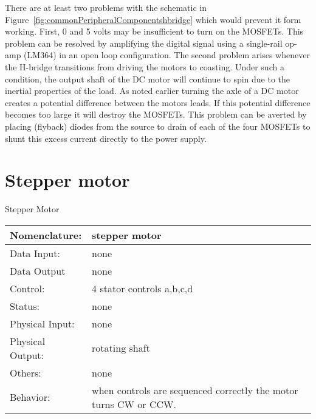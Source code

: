                             There are at least two problems with the schematic in
                            Figure~\ref{fig:commonPeripheralComponentshbridge} which would prevent it form working.
                            First, 0 and 5 volts may be insufficient to turn on the MOSFETs.
                            This problem can be resolved by amplifying the digital signal
                            using a single-rail op-amp (LM364) in an open loop configuration.
                            The second problem arises whenever the H-bridge transitions
                            from driving the motors to coasting.  Under such a condition, the
                            output shaft of the DC motor will continue to spin due to the
                            inertial properties of the load.  As noted earlier turning the
                            axle of a DC motor creates a potential difference between the
                            motors leads.  If this potential difference becomes too
                            large it will destroy the MOSFETs.
                            This problem can be averted by placing (flyback) diodes from the
                            source to drain of each of the four MOSFETs to shunt this excess
                            current directly to the power supply.

                            \section{Stepper motor}
                            \label{page:stepper}
                            \begin{buildingblock}{Stepper Motor}
                                \begin{tabular}{|l|p{3.5in}|} \hline
                                    Nomenclature:  & stepper motor \\ \hline
                                    Data Input:    & none     \\ \hline
                                    Data Output    & none    \\ \hline
                                    Control:       & 4 stator controls a,b,c,d  \\ \hline
                                    Status:        & none                                   \\ \hline
                                    Physical Input:& none        \\ \hline
                                    Physical Output:& rotating shaft \\ \hline
                                    Others:        & none                   \\ \hline
                                    Behavior:      & when controls are sequenced correctly the
                                    motor turns CW or CCW. \\ \hline
                                \end{tabular}
                            \end{buildingblock}

